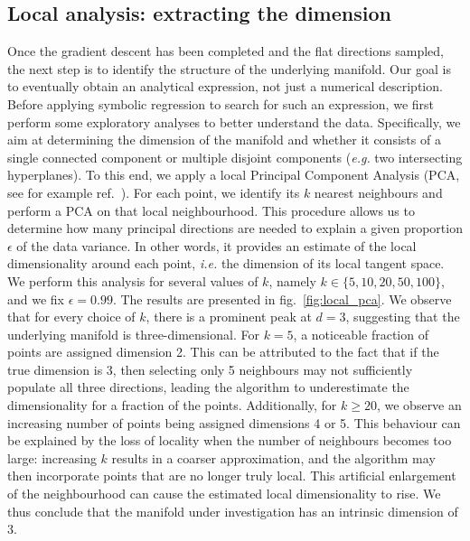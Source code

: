 \documentclass[11pt,a4paper]{article}
\begin{document}
	\subsection{Local analysis: extracting the dimension}
	Once the gradient descent has been completed and the flat directions sampled, the next step is to identify the structure of the underlying manifold. Our goal is to eventually obtain an analytical expression, not just a numerical description. Before applying symbolic regression to search for such an expression, we first perform some exploratory analyses to better understand the data. Specifically, we aim at determining the dimension of the manifold and whether it consists of a single connected component or multiple disjoint components (\textit{e.g.} two intersecting hyperplanes). To this end, we apply a local Principal Component Analysis (PCA, see for example ref.~\cite{scikit-learn}). For each point, we identify its $k$ nearest neighbours and perform a PCA on that local neighbourhood. This procedure allows us to determine how many principal directions are needed to explain a given proportion $\epsilon$ of the data variance. In other words, it provides an estimate of the local dimensionality around each point, \textit{i.e.} the dimension of its local tangent space. We perform this analysis for several values of $k$, namely $k \in \{5, 10, 20, 50, 100\}$, and we fix $\epsilon = 0.99$. The results are presented in fig.~\ref{fig:local_pca}. We observe that for every choice of $k$, there is a prominent peak at $d = 3$, suggesting that the underlying manifold is three-dimensional. For $k = 5$, a noticeable fraction of points are assigned dimension 2. This can be attributed to the fact that if the true dimension is 3, then selecting only 5 neighbours may not sufficiently populate all three directions, leading the algorithm to underestimate the dimensionality for a fraction of the points. Additionally, for $k \geq 20$, we observe an increasing number of points being assigned dimensions 4 or 5. This behaviour can be explained by the loss of locality when the number of neighbours becomes too large: increasing $k$ results in a coarser approximation, and the algorithm may then incorporate points that are no longer truly local. This artificial enlargement of the neighbourhood can cause the estimated local dimensionality to rise. We thus conclude that the manifold under investigation has an intrinsic dimension of 3.
\end{document}
